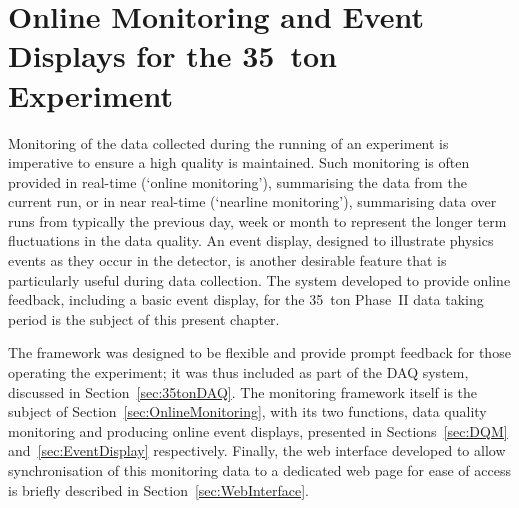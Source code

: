 
\graphicspath{{OnlineMonitoring/Figs/}}

\chapter{Online Monitoring and Event Displays for the 35~ton Experiment}\label{chap:OnlineMonitoring}

Monitoring of the data collected during the running of an experiment is imperative to ensure a high quality is maintained.  Such monitoring is often provided in real-time (`online monitoring'), summarising the data from the current run, or in near real-time (`nearline monitoring'), summarising data over runs from typically the previous day, week or month to represent the longer term fluctuations in the data quality.  An event display, designed to illustrate physics events as they occur in the detector, is another desirable feature that is particularly useful during data collection.  The system developed to provide online feedback, including a basic event display, for the 35~ton Phase~II data taking period is the subject of this present chapter.

The framework was designed to be flexible and provide prompt feedback for those operating the experiment; it was thus included as part of the DAQ system, discussed in Section~\ref{sec:35tonDAQ}.  The monitoring framework itself is the subject of Section~\ref{sec:OnlineMonitoring}, with its two functions, data quality monitoring and producing online event displays, presented in Sections~\ref{sec:DQM} and~\ref{sec:EventDisplay} respectively.  Finally, the web interface developed to allow synchronisation of this monitoring data to a dedicated web page for ease of access is briefly described in Section~\ref{sec:WebInterface}.


